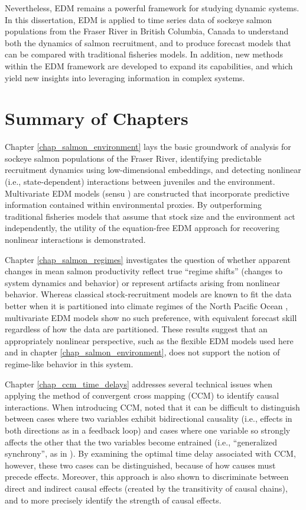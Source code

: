 Nevertheless, EDM remains a powerful framework for studying dynamic systems. In this dissertation, EDM is applied to  time series data of sockeye salmon populations from the Fraser River in British Columbia, Canada to understand both the dynamics of salmon recruitment, and to produce forecast models that can be compared with traditional fisheries models. In addition, new methods within the EDM framework are developed to expand its capabilities, and which yield new insights into leveraging information in complex systems.

\section{Summary of Chapters}

Chapter \ref{chap_salmon_environment} lays the basic groundwork of analysis for sockeye salmon populations of the Fraser River, identifying predictable recruitment dynamics using low-dimensional embeddings, and detecting nonlinear (i.e., state-dependent) interactions between juveniles and the environment. Multivariate EDM models (sensu \cite{Dixon_1999, Deyle_2013}) are constructed that incorporate predictive information contained within environmental proxies. By outperforming traditional fisheries models that assume that stock size and the environment act independently, the utility of the equation-free EDM approach for recovering nonlinear interactions is demonstrated.

Chapter \ref{chap_salmon_regimes} investigates the question of whether apparent changes in mean salmon productivity reflect true ``regime shifts'' (changes to system dynamics and behavior) or represent artifacts arising from nonlinear behavior. Whereas classical stock-recruitment models are known to fit the data better when it is partitioned into climate regimes of the North Pacific Ocean \cite{Beamish_2004a}, multivariate EDM models show no such preference, with equivalent forecast skill regardless of how the data are partitioned. These results suggest that an appropriately nonlinear perspective, such as the flexible EDM models used here and in chapter \ref{chap_salmon_environment}, does not support the notion of regime-like behavior in this system.

Chapter \ref{chap_ccm_time_delays} addresses several technical issues when applying the method of convergent cross mapping (CCM) to identify causal interactions. When introducing CCM, \cite{Sugihara_2012} noted that it can be difficult to distinguish between cases where two variables exhibit bidirectional causality (i.e., effects in both directions as in a feedback loop) and cases where one variable so strongly affects the other that the two variables become entrained (i.e., ``generalized synchrony'', as in \cite{Rulkov_1995}). By examining the optimal time delay associated with CCM, however, these two cases can be distinguished, because of how causes must precede effects. Moreover, this approach is also shown to discriminate between direct and indirect causal effects (created by the transitivity of causal chains), and to more precisely identify the strength of causal effects.


